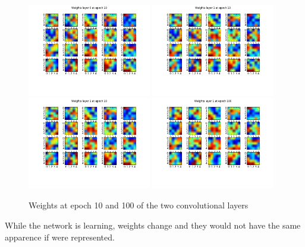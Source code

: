\begin{figure}[htb]
\centering
\includegraphics[width=0.48\textwidth]{images/images_lenet/w_layer0_epoch10.png}
\includegraphics[width=0.48\textwidth]{images/images_lenet/w_layer1_epoch10.png}
\includegraphics[width=0.48\textwidth]{images/images_lenet/w_layer1_epoch10.png}
\includegraphics[width=0.48\textwidth]{images/images_lenet/w_layer1_epoch100.png}

\caption{Weights at epoch 10 and 100 of the two convolutional layers } \label{fig:weights_lenet}
\end{figure}

While the network is learning, weights change and they would not have the same apparence if were represented. \\


